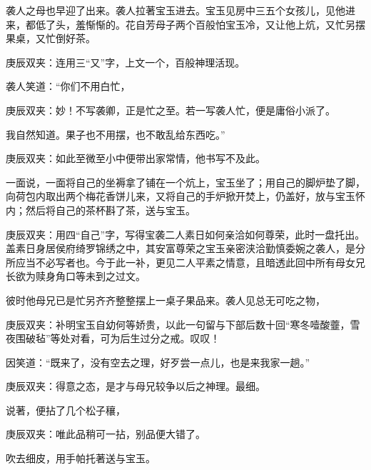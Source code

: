 \begin{parag}
    袭人之母也早迎了出来。袭人拉著宝玉进去。宝玉见房中三五个女孩儿，见他进来，都低了头，羞惭惭的。花自芳母子两个百般怕宝玉冷，又让他上炕，又忙另摆果桌，又忙倒好茶。\begin{note}庚辰双夹：连用三“又”字，上文一个，百般神理活现。\end{note}袭人笑道：“你们不用白忙，\begin{note}庚辰双夹：妙！不写袭卿，正是忙之至。若一写袭人忙，便是庸俗小派了。\end{note}我自然知道。果子也不用摆，也不敢乱给东西吃。”\begin{note}庚辰双夹：如此至微至小中便带出家常情，他书写不及此。\end{note}一面说，一面将自己的坐褥拿了铺在一个炕上，宝玉坐了；用自己的脚炉垫了脚，向荷包内取出两个梅花香饼儿来，又将自己的手炉掀开焚上，仍盖好，放与宝玉怀内；然后将自己的茶杯斟了茶，送与宝玉。\begin{note}庚辰双夹：用四“自己”字，写得宝袭二人素日如何亲洽如何尊荣，此时一盘托出。盖素日身居侯府绮罗锦绣之中，其安富尊荣之宝玉亲密浃洽勤慎委婉之袭人，是分所应当不必写者也。今于此一补，更见二人平素之情意，且暗透此回中所有母女兄长欲为赎身角口等未到之过文。\end{note}彼时他母兄已是忙另齐齐整整摆上一桌子果品来。袭人见总无可吃之物，\begin{note}庚辰双夹：补明宝玉自幼何等娇贵，以此一句留与下部后数十回“寒冬噎酸虀，雪夜围破毡”等处对看，可为后生过分之戒。叹叹！\end{note}因笑道：“既来了，没有空去之理，好歹尝一点儿，也是来我家一趟。”\begin{note}庚辰双夹：得意之态，是才与母兄较争以后之神理。最细。\end{note}说著，便拈了几个松子穰，\begin{note}庚辰双夹：唯此品稍可一拈，别品便大错了。\end{note}吹去细皮，用手帕托著送与宝玉。
\end{parag}


